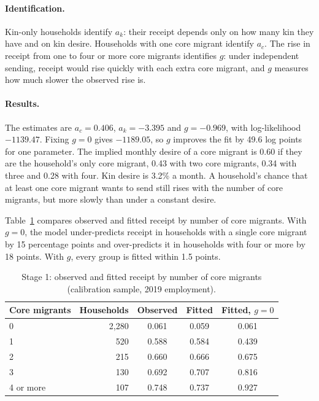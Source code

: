 \documentclass[11pt]{article}
\begin{document}
\paragraph{Identification.} Kin-only households identify $a_k$: their receipt depends only on how many kin they have and on kin desire. Households with one core migrant identify $a_c$. The rise in receipt from one to four or more core migrants identifies $g$: under independent sending, receipt would rise quickly with each extra core migrant, and $g$ measures how much slower the observed rise is.

\paragraph{Results.} The estimates are $a_c = 0.406$, $a_k = -3.395$ and $g = -0.969$, with log-likelihood $-1139.47$. Fixing $g = 0$ gives $-1189.05$, so $g$ improves the fit by 49.6 log points for one parameter. The implied monthly desire of a core migrant is 0.60 if they are the household's only core migrant, 0.43 with two core migrants, 0.34 with three and 0.28 with four. Kin desire is 3.2\% a month. A household's chance that at least one core migrant wants to send still rises with the number of core migrants, but more slowly than under a constant desire.

Table~\ref{tab:stage1} compares observed and fitted receipt by number of core migrants. With $g = 0$, the model under-predicts receipt in households with a single core migrant by 15 percentage points and over-predicts it in households with four or more by 18 points. With $g$, every group is fitted within 1.5 points.

\begin{table}[ht]
\centering
\caption{Stage 1: observed and fitted receipt by number of core migrants (calibration sample, 2019 employment).}
\label{tab:stage1}
\begin{tabular}{lrccc}
\toprule
Core migrants & Households & Observed & Fitted & Fitted, $g = 0$ \\
\midrule
0 & 2,280 & 0.061 & 0.059 & 0.061 \\
1 & 520 & 0.588 & 0.584 & 0.439 \\
2 & 215 & 0.660 & 0.666 & 0.675 \\
3 & 130 & 0.692 & 0.707 & 0.816 \\
4 or more & 107 & 0.748 & 0.737 & 0.927 \\
\bottomrule
\end{tabular}
\end{table}
\end{document}
